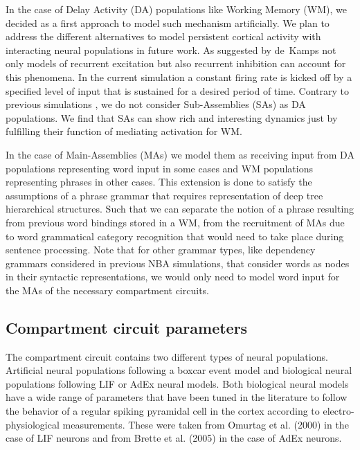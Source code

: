\documentclass[10pt]{article}
\begin{document}
In the case of Delay Activity (DA) populations like Working Memory (WM), we decided as a first approach to model such mechanism artificially.
We plan to address the different alternatives to model persistent cortical activity with interacting neural populations in future work.
As suggested by de~Kamps\cite{de_Kamps_2005} not only models of recurrent excitation but also recurrent inhibition can account for this phenomena.
In the current simulation a constant firing rate is kicked off by a specified level of input that is sustained for a desired period of time.
Contrary to previous simulations \cite{velde2015ambiguity}, we do not consider Sub-Assemblies (SAs) as DA populations.
We find that SAs can show rich and interesting dynamics just by fulfilling their function of mediating activation for WM.

In the case of Main-Assemblies (MAs) we model them as receiving input from DA populations representing word input in some cases and WM populations representing phrases in other cases.
This extension is done to satisfy the assumptions of a phrase grammar that requires representation of deep tree hierarchical structures. Such that we can separate the notion of a phrase resulting from previous word bindings stored in a WM, from the recruitment of MAs due to word grammatical category recognition that would need to take place during sentence processing.
Note that for other grammar types, like dependency grammars considered in previous NBA simulations\cite{velde2015ambiguity}, that consider words as nodes in their syntactic representations, we would only need to model word input for the MAs of the necessary compartment circuits.


\subsection{Compartment circuit parameters}\label{compartment-circuit-parameters}

The compartment circuit contains two different types of neural populations.
Artificial neural populations following a boxcar event model and biological neural populations following LIF or AdEx neural models.
Both biological neural models have a wide range of parameters that have been tuned in the literature to follow the behavior of a regular spiking pyramidal cell in the cortex according to electro-physiological measurements.
These were taken from Omurtag et al. (2000) \cite{omurtag2000simulation} in the case of LIF neurons and from Brette et al.
(2005) \cite{Brette_2005} in the case of AdEx neurons.
\end{document}
